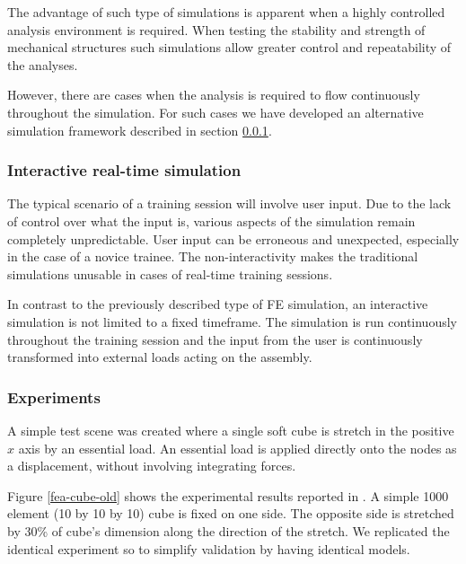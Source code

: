   The advantage of such type of simulations is apparent when a highly controlled analysis environment is required. When testing the stability and strength of mechanical structures such simulations allow greater control and repeatability of the analyses.

  However, there are cases when the analysis is required to flow continuously throughout the simulation. For such cases we have developed an alternative simulation framework described in section \ref{methodology-fea-interactive}.

  \subsubsection{Interactive real-time simulation}\label{methodology-fea-interactive}

  The typical scenario of a training session will involve user input. Due to the lack of control over what the input is, various aspects of the simulation remain completely unpredictable. User input can be erroneous and unexpected, especially in the case of a novice trainee. The non-interactivity makes the traditional simulations unusable in cases of real-time training sessions.

  In contrast to the previously described type of FE simulation, an interactive simulation is not limited to a fixed timeframe. The simulation is run continuously throughout the training session and the  input from the user is continuously transformed into external loads acting on the assembly.


  \subsubsection{Experiments}

  A simple test scene was created where a single soft cube is stretch in the positive $x$ axis by an essential load. An essential load is applied directly onto the nodes as a displacement, without involving integrating forces.

  Figure \ref{fea-cube-old} shows the experimental results reported in \cite{Miller2007}. A simple 1000 element (10 by 10 by 10) cube is fixed on one side. The opposite side is stretched by 30\% of cube's dimension along the direction of the stretch. We replicated the identical experiment so to simplify validation by having identical models.

